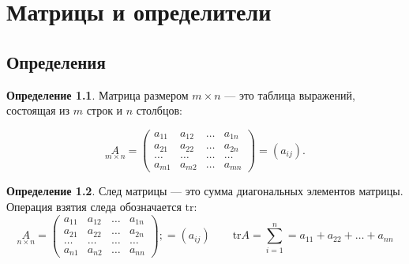 \documentclass[a5paper, 11pt]{extbook}
\author{Daniil Shvalov}
\date{\today}
\title{}
\theoremstyle{definition}
\theoremstyle{definition}
\newtheorem{definition}{Определение}[section]
\theoremstyle{definition}
\begin{document}
\tableofcontents


\hypersetup{linktoc = all, colorlinks = true, urlcolor = DodgerBlue4, citecolor = PaleGreen1, linkcolor = blue}

\makeatletter
\def\thm@space@setup{\thm@preskip=1pt
    \thm@postskip=1pt}
\makeatother

\def\lets{%
    \mathord{\setbox0=\hbox{$\exists$}%
        \hbox{\kern 0.125\wd0%
            \vbox to \ht0{%
                \hrule width 0.75\wd0%
                \vfill%
                \hrule width 0.75\wd0}%
            \vrule height \ht0%
            \kern 0.125\wd0}%
    }%
}


\chapter{Матрицы и определители}
\label{sec:org37c4e21}
\section{Определения}
\label{sec:orgc3e0aac}
\begin{definition}
    Матрица размером \(m \times n\) — это таблица выражений, состоящая из \(m\) строк и \(n\) столбцов:

    \begin{equation*}
        \underset{m \times n}{A} =
        \begin{pmatrix}
            a_{11} & a_{12} & \ldots & a_{1n} \\
            a_{21} & a_{22} & \ldots & a_{2n} \\
            \ldots & \ldots & \ldots & \ldots \\
            a_{m1} & a_{m2} & \ldots & a_{mn}
        \end{pmatrix}
        = (a_{ij}).
    \end{equation*}
\end{definition}

\begin{definition}
    След матрицы — это сумма диагональных элементов матрицы. Операция взятия следа обозначается \(\mathrm{tr}\):
    \begin{equation*}
        \underset{n \times n}{A} =
        \begin{pmatrix}
            a_{11} & a_{12} & \ldots & a_{1n} \\
            a_{21} & a_{22} & \ldots & a_{2n} \\
            \ldots & \ldots & \ldots & \ldots \\
            a_{n1} & a_{n2} & \ldots & a_{nn}
        \end{pmatrix};
        = (a_{ij})
        \qquad
        \mathrm{tr} A = \sum_{i = 1}^n = a_{11} + a_{22} + \ldots + a_{nn}
    \end{equation*}
\end{definition}
\end{document}
